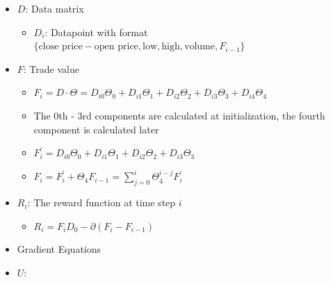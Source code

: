 \documentclass[11pt]{exam}
\theoremstyle{quest}
\newcommand{\deriv}[2]{\frac{\partial #1}{\partial #2}}
\begin{document}
\begin{itemize}
    \item $D$: Data matrix \\
    \begin{itemize}
        \item $D_i$: Datapoint with format $\{\text{close price} - \text{open price}, \text{low}, \text{high}, \text{volume},F_{i-1}\}$
    \end{itemize}
    \item $F$: Trade value%
    \begin{itemize}
        \item $F_i = D \cdot \Theta = D_{i0}\Theta_0 + D_{i1}\Theta_1 +D_{i2}\Theta_2 +D_{i3}\Theta_3 +D_{i4}\Theta_4$
        \item The 0th - 3rd components are calculated at initialization, the fourth component is calculated later
        \item $F_i^\prime =  D_{i0}\Theta_0 + D_{i1}\Theta_1 +D_{i2}\Theta_2 +D_{i3}\Theta_3$
        \item $F_i = F_i^\prime + \Theta_4 F_{i-1} = \sum_{j=0}^i \Theta_4^{i-j} F_i^\prime$

    \end{itemize}
    \item $R_i$: The reward function at time step $i$
    \begin{itemize}
        \item $R_i = F_i D_0 - \partial(F_i - F_{i-1})$
    \end{itemize}
    \item Gradient Equations
    \item $U$: %

\end{itemize}
\end{document}
